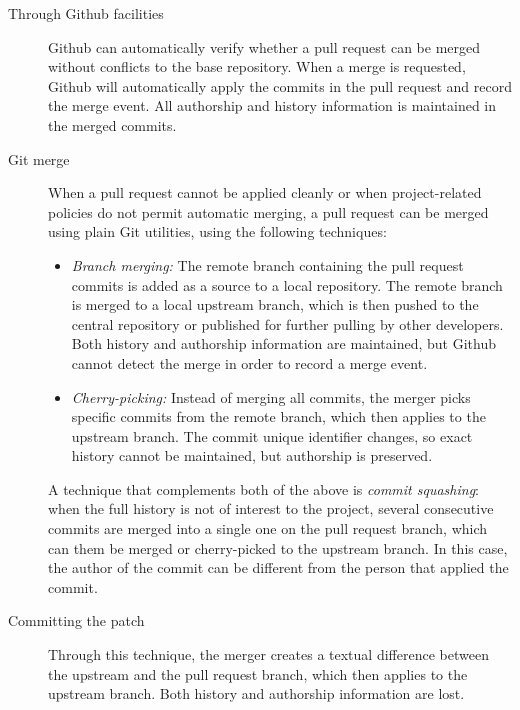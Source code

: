 \documentclass{acm_proc_article-sp}
\begin{document}
\begin{description}

  \item[Through Github facilities] Github can automatically verify whether a
    pull request can be merged without conflicts to the base repository. When a
    merge is requested, Github will automatically apply the commits in the pull
    request and record the merge event. All authorship and history information
    is maintained in the merged commits.

  \item[Git merge] When a pull request cannot be applied cleanly or when
    project-related policies do not permit automatic merging, a pull request
    can be merged using plain Git utilities, using the following
    techniques: 

    \begin{itemize}

      \item \emph{Branch merging:} The remote branch containing the pull
        request commits is added as a source to a local repository. The remote 
        branch is merged to a local upstream branch, which is then pushed to
        the central repository or published for further pulling by other
        developers. Both history and authorship information are maintained,
        but Github cannot detect the merge in order to record a merge event. 

      \item \emph{Cherry-picking:} Instead of merging all commits, the merger
        picks specific commits from the remote branch, which then applies to the
        upstream branch. The commit unique identifier changes, so exact history
        cannot be maintained, but authorship is preserved.
    
    \end{itemize}

    A technique that complements both of the above is \emph{commit
    squashing}: when the full history is not of interest to the project,
    several consecutive commits are merged into a single one on the pull request
    branch, which can them be merged or cherry-picked to the upstream branch. In
    this case, the author of the commit can be different from the person that
    applied the commit.

  \item [Committing the patch] Through this technique, the merger creates a
    textual difference between the upstream and the pull request branch, which
    then applies to the upstream branch. Both history and authorship information
    are lost.

\end{description}
\end{document}
